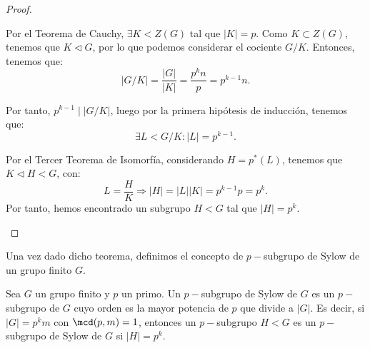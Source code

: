 \begin{ejercicio}
\begin{teo}
\begin{proof}
\begin{itemize}
\begin{itemize}
\begin{itemize}
                        Por el Teorema de Cauchy, $\exists K<Z(G)$ tal que $|K| = p$. Como $K\subset Z(G)$, tenemos que \(K\lhd G\), por lo que podemos considerar el cociente \(G/K\). Entonces, tenemos que:
                        \begin{equation*}
                            |G/K| = \frac{|G|}{|K|} = \frac{p^k n}{p} = p^{k-1} n.
                        \end{equation*}

                        Por tanto, $p^{k-1}\mid |G/K|$, luego por la primera hipótesis de inducción, tenemos que:
                        \begin{equation*}
                            \exists L<G/K: |L| = p^{k-1}.
                        \end{equation*}

                        Por el Tercer Teorema de Isomorfía, considerando $H=p^*(L)$, tenemos que $K\lhd H<G$, con:
                        \begin{equation*}
                            L=\frac{H}{K} \Longrightarrow |H| = |L||K| = p^{k-1} p = p^k.
                        \end{equation*}
                        Por tanto, hemos encontrado un subgrupo \(H<G\) tal que \(|H| = p^k\).
                    \end{itemize}
                \end{itemize}
            \end{itemize}
        \end{proof}
    \end{teo}

    Una vez dado dicho teorema, definimos el concepto de \(p-\)subgrupo de Sylow de un grupo finito \(G\).
    \begin{definicion}
        Sea \(G\) un grupo finito y \(p\) un primo. Un \(p-\)subgrupo de Sylow de \(G\) es un \(p-\)subgrupo de $G$ cuyo orden es la mayor potencia de \(p\) que divide a \(|G|\).
        Es decir, si \(|G| = p^k m\) con \(\mcd(p, m) = 1\), entonces un \(p-\)subgrupo $H<G$ es un \(p-\)subgrupo de Sylow de \(G\) si \(|H| = p^k\).
    \end{definicion}


\end{ejercicio}
